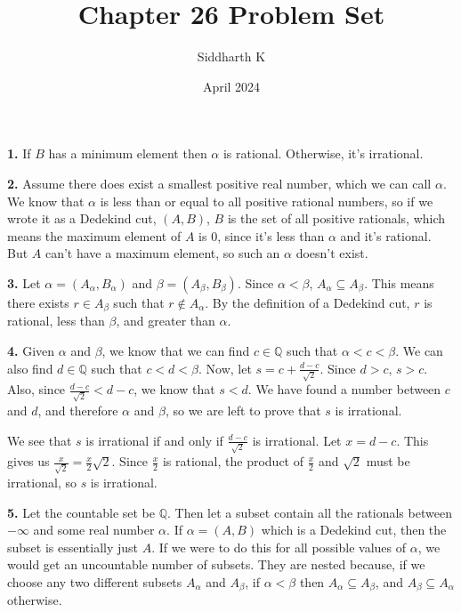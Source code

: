 \documentclass{article}
\title{Chapter 26 Problem Set}
\author{Siddharth K}
\date{April 2024}
\begin{document}
\maketitle

\textbf{1.} If $B$ has a minimum element then $\alpha$ is rational. Otherwise, it's irrational.
\newline

\textbf{2.} Assume there does exist a smallest positive real number, which we can call $\alpha$. We know that $\alpha$ is less than or equal to all positive rational numbers, so if we wrote it as a Dedekind cut, $(A, B)$, $B$ is the set of all positive rationals, which means the maximum element of $A$ is $0$, since it's less than $\alpha$ and it's rational. But $A$ can't have a maximum element, so such an $\alpha$ doesn't exist.
\newline

\textbf{3.} Let $\alpha = (A_\alpha, B_\alpha)$ and $\beta = (A_\beta, B_\beta)$. Since $\alpha < \beta$, $A_\alpha \subseteq A_\beta$. This means there exists $r \in A_\beta$ such that $r \not \in A_\alpha$. By the definition of a Dedekind cut, $r$ is rational, less than $\beta$, and greater than $\alpha$.
\newline

\textbf{4.} Given $\alpha$ and $\beta$, we know that we can find $c \in \mathbb{Q}$ such that $\alpha < c < \beta$. We can also find $d \in \mathbb{Q}$ such that $c < d < \beta$. Now, let $s = c + \frac{d - c}{\sqrt{2}}$. Since $d > c$, $s > c$. Also, since $\frac{d - c}{\sqrt{2}} < d - c$, we know that $s < d$. We have found a number between $c$ and $d$, and therefore $\alpha$ and $\beta$, so we are left to prove that $s$ is irrational.
\newline

We see that $s$ is irrational if and only if $\frac{d - c}{\sqrt{2}}$ is irrational. Let $x = d - c$. This gives us $\frac{x}{\sqrt{2}} = \frac{x}{2}\sqrt{2}$. Since $\frac{x}{2}$ is rational, the product of $\frac{x}{2}$ and $\sqrt{2}$ must be irrational, so $s$ is irrational.
\newline

\textbf{5.} Let the countable set be $\mathbb{Q}$. Then let a subset contain all the rationals between $-\infty$ and some real number $\alpha$. If $\alpha = (A, B)$ which is a Dedekind cut, then the subset is essentially just $A$. If we were to do this for all possible values of $\alpha$, we would get an uncountable number of subsets. They are nested because, if we choose any two different subsets $A_\alpha$ and $A_\beta$, if $\alpha < \beta$ then $A_\alpha \subseteq A_\beta$, and $A_\beta \subseteq A_\alpha$ otherwise.
\newline
\end{document}
